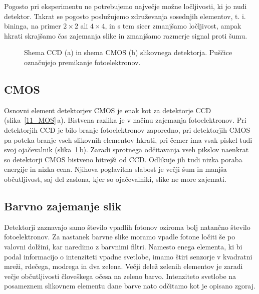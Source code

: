 \begin{remark}
Pogosto pri eksperimentu ne potrebujemo največje možne ločljivosti, ki jo nudi detektor. 
Takrat se pogosto poslužujemo združevanja sosednjih elementov, t. i. bininga, na primer $2\times2$
ali $4\times4$, in s tem sicer zmanjšamo ločljivost, ampak hkrati skrajšamo čas
zajemanja slike in zmanjšamo razmerje signal proti šumu. 
\end{remark}

\begin{figure}[h]
\centering
\def\svgwidth{80truemm} 

\caption{Shema CCD (a) in shema CMOS (b) slikovnega detektorja. Puščice označujejo premikanje
fotoelektronov.}
\label{11_CCD}
\end{figure}

\subsection*{CMOS}
Osnovni element detektorjev CMOS je enak kot za detektorje CCD (slika~\ref{11_MOS}\,a). 
Bistvena razlika je v načinu zajemanja fotoelektronov. Pri detektorjih CCD je bilo branje 
fotoelektronov zaporedno, pri detektorjih CMOS pa poteka branje vseh slikovnih elementov 
hkrati, pri čemer ima vsak piskel tudi svoj ojačevalnik (slika~\ref{11_CCD}\,b).
Zaradi sprotnega odčitavanja vseh pikslov naenkrat so detektorji CMOS bistveno hitrejši 
od CCD. Odlikuje jih tudi nizka poraba energije in nizka cena. Njihova poglavitna slabost
je večji šum in manjša občutljivost, saj del zaslona, kjer so ojačevalniki, slike ne more
zajemati. 

\subsection*{Barvno zajemanje slik}
Detektorji zaznavajo samo število vpadlih fotonov oziroma bolj natančno število fotoelektronov.
Za nastanek barvne slike moramo vpadle fotone ločiti še po valovni dolžini, kar naredimo
z barvnimi filtri. Namesto enega elementa, ki bi podal informacijo o intenziteti vpadne 
svetlobe, imamo štiri senzorje v kvadratni mreži, rdečega, modrega in dva zelena. 
Večji delež zelenih elementov je zaradi večje občutljivosti človeškega očesa na zeleno barvo. 
Intenziteto svetlobe na posameznem slikovnem elementu dane barve nato odčitamo kot je
opisano zgoraj.
 
